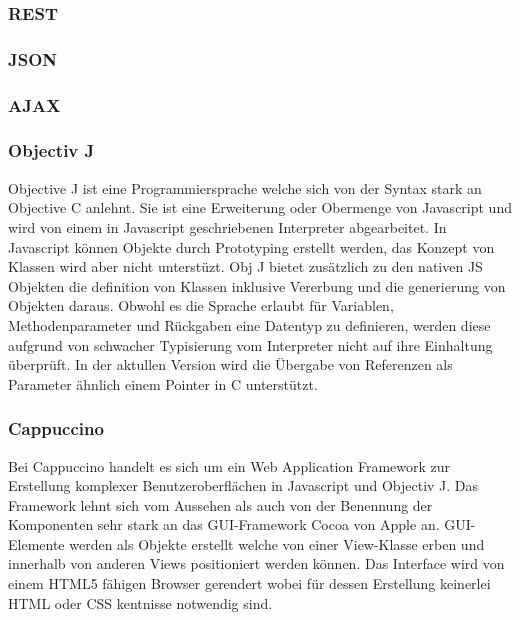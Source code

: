\subsubsection{REST}
\label{sec:HTTP}

\subsubsection{JSON}
\label{sec:JSON}

\subsubsection{AJAX}
\label{sec:AJAX}

\subsubsection{Objectiv J}
\label{sec:Objectiv J}

Objective J ist eine Programmiersprache welche sich von der Syntax stark an Objective C anlehnt.
Sie ist eine Erweiterung oder Obermenge von Javascript und wird von einem in Javascript geschriebenen Interpreter abgearbeitet.
In Javascript können Objekte durch Prototyping erstellt werden, das Konzept von Klassen wird aber nicht unterstüzt.
Obj J bietet zusätzlich zu den nativen JS Objekten die definition von Klassen inklusive Vererbung und die generierung von Objekten daraus.
Obwohl es die Sprache erlaubt für Variablen, Methodenparameter und Rückgaben eine Datentyp zu definieren, 
werden diese aufgrund von schwacher Typisierung vom Interpreter nicht auf ihre Einhaltung überprüft.
In der aktullen Version wird die Übergabe von Referenzen als Parameter ähnlich einem Pointer in C unterstützt.
\cite{capp}

\subsubsection{Cappuccino}
\label{sec:Cappuccino}
Bei Cappuccino handelt es sich um ein Web Application Framework zur Erstellung komplexer Benutzeroberflächen in Javascript und Objectiv J.
Das Framework lehnt sich vom Aussehen als auch von der Benennung der Komponenten sehr stark an das GUI-Framework Cocoa von Apple an.
GUI-Elemente werden als Objekte erstellt welche von einer View-Klasse erben und innerhalb von anderen Views positioniert werden können.
Das Interface wird von einem HTML5 fähigen Browser gerendert wobei für dessen Erstellung keinerlei HTML oder CSS kentnisse notwendig sind.

